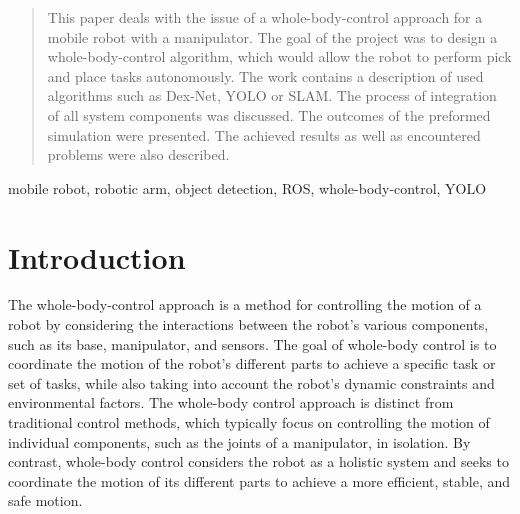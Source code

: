 \documentclass[conference,a4paper]{IEEEtran}
\begin{document}
\begin{abstract}
This paper deals with the issue of a whole-body-control approach for a mobile robot with a manipulator.
The goal of the project was to design a whole-body-control algorithm, which would allow the robot to perform pick and place tasks autonomously.
The work contains a description of used algorithms such as Dex-Net, YOLO or SLAM. The process of integration of all system components was discussed.
The outcomes of the preformed simulation were presented.
The achieved results as well as encountered problems were also described.
\end{abstract}

\begin{IEEEkeywords}
mobile robot, robotic arm, object detection, ROS, whole-body-control, YOLO
\end{IEEEkeywords}



%
\IEEEpeerreviewmaketitle


\section{Introduction}

The whole-body-control approach is a method for controlling the motion of a robot by considering the interactions between the robot's various components, such as its base, manipulator, and sensors. The goal of whole-body control is to coordinate the motion of the robot's different parts to achieve a specific task or set of tasks, while also taking into account the robot's dynamic constraints and environmental factors.
The whole-body control approach is distinct from traditional control methods, which typically focus on controlling the motion of individual components, such as the joints of a manipulator, in isolation. By contrast, whole-body control considers the robot as a holistic system and seeks to coordinate the motion of its different parts to achieve a more efficient, stable, and safe motion.
\end{document}
